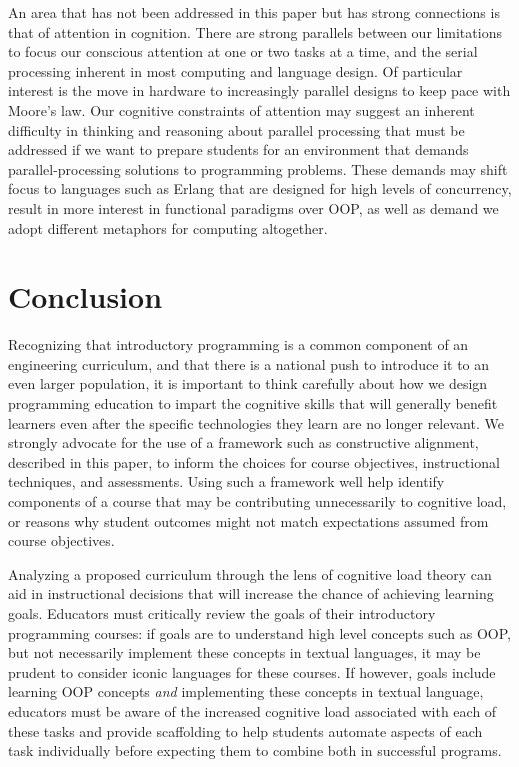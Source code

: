 \documentclass[12pt]{article}
\begin{document}
An area that has not been addressed in this paper but has strong
connections is that of attention in
cognition\autocite{simon_role_1986}. There are strong parallels
between our limitations to focus our conscious attention at one or two
tasks at a time, and the serial processing inherent in most computing
and language design. Of particular interest is the move in hardware to
increasingly parallel designs to keep pace with Moore's law. Our
cognitive constraints of attention may suggest an inherent difficulty
in thinking and reasoning about parallel processing that must be
addressed if we want to prepare students for an environment that
demands parallel-processing solutions to programming problems. These
demands may shift focus to languages such as Erlang that are designed
for high levels of concurrency, result in more interest in functional
paradigms over OOP, as well as demand we adopt different metaphors for
computing altogether\autocite{stein_challenging_1999}.

\section*{Conclusion}

Recognizing that introductory programming is a common component of an
engineering curriculum, and that there is a national push to introduce
it to an even larger population, it is important to think carefully
about how we design programming education to impart the cognitive
skills that will generally benefit learners even after the specific
technologies they learn are no longer relevant. We strongly advocate
for the use of a framework such as constructive alignment, described
in this paper, to inform the choices for course objectives,
instructional techniques, and assessments. Using such a framework well
help identify components of a course that may be contributing
unnecessarily to cognitive load, or reasons why student outcomes might
not match expectations assumed from course objectives.

Analyzing a proposed curriculum through the lens of cognitive load
theory can aid in instructional decisions that will increase the
chance of achieving learning goals. Educators must critically review
the goals of their introductory programming courses: if goals are to
understand high level concepts such as OOP, but not necessarily
implement these concepts in textual languages, it may be prudent to
consider iconic languages for these courses. If however, goals include
learning OOP concepts \emph{and} implementing these concepts in
textual language, educators must be aware of the increased cognitive
load associated with each of these tasks and provide scaffolding to
help students automate aspects of each task individually before
expecting them to combine both in successful programs.
\end{document}
